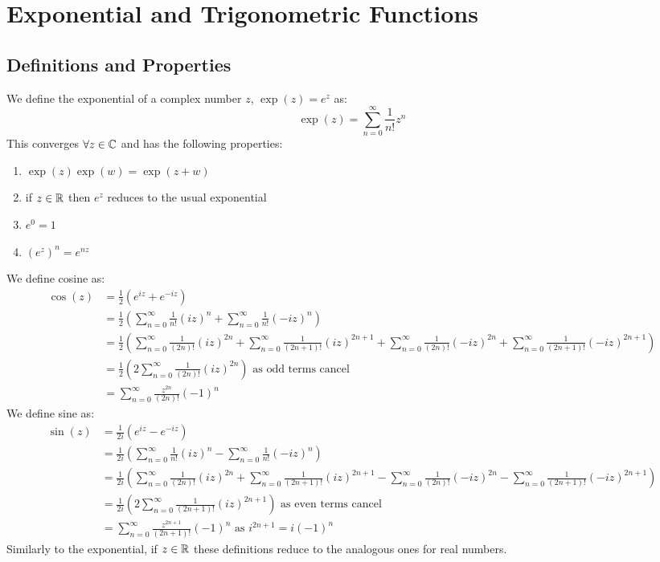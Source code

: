 \documentclass[../main.tex]{subfiles}
\begin{document}
\section{Exponential and Trigonometric Functions}
\subsection{Definitions and Properties}
We define the exponential of a complex number $z$, $\exp(z) = e^z$ as:
\[
  \exp(z) = \sum_{n=0}^{\infty} \frac{1}{n!} z^n
\]
This converges $\forall z \in \mathbb{C}$ and has the following properties:
\begin{enumerate}
  \item $\exp(z)\exp(w) = \exp(z + w)$
  \item if $z \in \mathbb{R}$ then $e^z$ reduces to the usual exponential
  \item $e^0 = 1$
  \item $(e^z)^n = e^{nz}$
\end{enumerate}
We define cosine as:
\begin{align*}
  \cos(z) &= \frac{1}{2}(e^{iz} + e^{-iz}) \\
          &= \frac{1}{2}\left(\sum_{n=0}^{\infty} \frac{1}{n!} (iz)^{n} + \sum_{n=0}^{\infty} \frac{1}{n!} (-iz)^{n}\right) \\
          &= \frac{1}{2}\left(\sum_{n=0}^{\infty} \frac{1}{(2n)!}(iz)^{2n} + \sum_{n=0}^{\infty} \frac{1}{(2n + 1)!}(iz)^{2n + 1} + \sum_{n=0}^{\infty} \frac{1}{(2n)!}(-iz)^{2n} + \sum_{n=0}^{\infty} \frac{1}{(2n + 1)!}(-iz)^{2n + 1}\right) \\
          &= \frac{1}{2} \left(2\sum_{n=0}^{\infty} \frac{1}{(2n)!} (iz)^{2n}\right) \text{ as odd terms cancel}\\
          &= \sum_{n=0}^{\infty} \frac{z^{2n}}{(2n)!} (-1)^{n}
\end{align*}
We define sine as:
\begin{align*}
  \sin(z) &= \frac{1}{2i}(e^{iz} - e^{-iz}) \\
          &= \frac{1}{2i}\left(\sum_{n=0}^{\infty} \frac{1}{n!} (iz)^{n} - \sum_{n=0}^{\infty} \frac{1}{n!} (-iz)^{n}\right) \\
          &= \frac{1}{2i}\left(\sum_{n=0}^{\infty} \frac{1}{(2n)!}(iz)^{2n} + \sum_{n=0}^{\infty} \frac{1}{(2n + 1)!}(iz)^{2n + 1} - \sum_{n=0}^{\infty} \frac{1}{(2n)!}(-iz)^{2n} - \sum_{n=0}^{\infty} \frac{1}{(2n + 1)!}(-iz)^{2n + 1}\right) \\
          &= \frac{1}{2i} \left(2\sum_{n=0}^{\infty} \frac{1}{(2n + 1)!} (iz)^{2n + 1}\right) \text{ as even terms cancel}\\
          &= \sum_{n=0}^{\infty} \frac{z^{2n + 1}}{(2n + 1)!} (-1)^{n} \text{ as $i^{2n + 1} = i(-1)^{n}$}
\end{align*}
Similarly to the exponential, if $z \in \mathbb{R}$ these definitions reduce to the analogous ones for real numbers.
\end{document}
